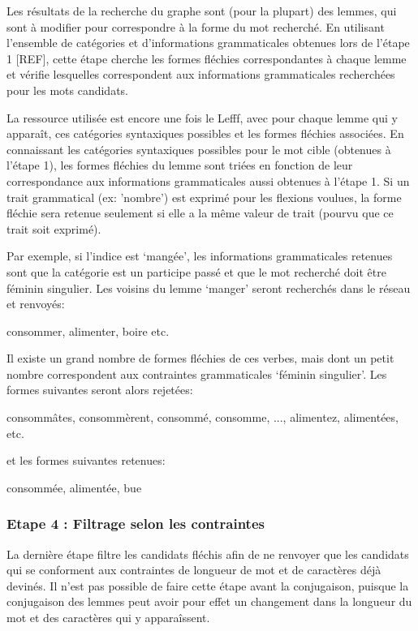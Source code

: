 Les résultats de la recherche du graphe sont (pour la plupart) des lemmes, qui sont à modifier pour correspondre à la forme du mot recherché. En utilisant l'ensemble de catégories et d'informations grammaticales obtenues lors de l'étape 1 [REF], cette étape cherche les formes fléchies correspondantes à chaque lemme et vérifie lesquelles correspondent aux informations grammaticales recherchées pour les mots candidats.

La ressource utilisée est encore une fois le Lefff, avec pour chaque lemme qui y apparaît, ces catégories syntaxiques possibles et les formes fléchies associées. En connaissant les catégories syntaxiques possibles pour le mot cible (obtenues à l'étape 1), les formes fléchies du lemme sont triées en fonction de leur correspondance aux informations grammaticales aussi obtenues à l'étape 1. Si un trait grammatical (ex: 'nombre') est exprimé pour les flexions voulues, la forme fléchie sera retenue seulement si elle a la même valeur de trait (pourvu que ce trait soit exprimé).

Par exemple, si l'indice est \lq{mangée}\rq{}, les informations grammaticales retenues sont que la catégorie est un participe passé et que le mot recherché doit être féminin singulier. Les voisins du lemme \lq{manger}\rq{} seront recherchés dans le réseau et renvoyés:

\begin{framed}
consommer, alimenter, boire etc.
\end{framed}

Il existe un grand nombre de formes fléchies de ces verbes, mais dont un petit nombre correspondent aux contraintes grammaticales \lq{féminin singulier}\rq{}. Les formes suivantes seront alors rejetées:

\begin{framed}
consommâtes, consommèrent, consommé, consomme, ..., alimentez, alimentées, etc.
\end{framed}

et les formes suivantes retenues:

\begin{framed}
consommée, alimentée, bue
\end{framed}

\subsubsection{Etape 4 : Filtrage selon les contraintes}%

La dernière étape filtre les candidats fléchis afin de ne renvoyer que les candidats qui se conforment aux contraintes de longueur de mot et de caractères déjà devinés. Il n'est pas possible de faire cette étape avant la conjugaison, puisque la conjugaison des lemmes peut avoir pour effet un changement dans la longueur du mot et des caractères qui y apparaîssent.

